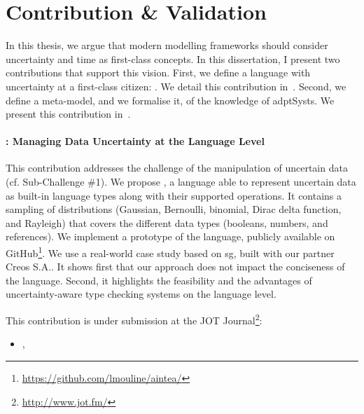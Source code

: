 \section{Contribution \& Validation}
\label{sec:intro:contrib}

In this thesis, we argue that modern modelling frameworks should consider uncertainty and time as first-class concepts.
In this dissertation, I present two contributions that support this vision.
First, we define a language with uncertainty at a first-class citizen: \langName.
We detail this contribution in~.
Second, we define a meta-model, and we formalise it, of the knowledge of \glspl{adptSyst}.
We present this contribution in~.

\paragraph{\langName{}: Managing Data Uncertainty at the Language Level}
This contribution addresses the challenge of the manipulation of uncertain data (cf. Sub-Challenge \#1). %
 We propose \langName{}, a language able to represent uncertain data as built-in language types along with their supported operations. 
 It contains a sampling of distributions (Gaussian, Bernoulli, binomial, Dirac delta function, and Rayleigh) that covers the different data types (booleans, numbers, and references).
 We implement a prototype of the language, publicly available on GitHub\footnote{\url{https://github.com/lmouline/aintea/}}.
 We use a real-world case study based on \gls{sg}, built with our partner Creos S.A..
It shows first that our approach does not impact the conciseness of the language.
Second, it highlights the feasibility and the advantages of uncertainty-aware type checking systems on the language level.

This contribution is under submission at the JOT Journal\footnote{\url{http://www.jot.fm/}}:
\begin{itemize}
	\item {}, \citeauthor{insubmission:2019:comlan:datauncertainty}
\end{itemize}

